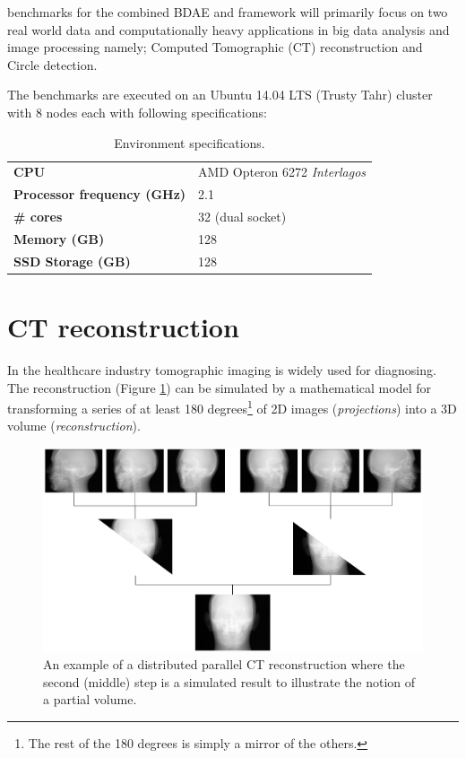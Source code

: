  benchmarks for the combined BDAE and \CodeName framework will primarily focus on two real world data and computationally heavy applications in big data analysis and image processing namely; Computed Tomographic (CT) reconstruction and Circle detection.
\newline

The benchmarks are executed on an Ubuntu 14.04 LTS (Trusty Tahr)\cite{PageUbuntu1404} cluster with 8 nodes each with following specifications:
\vspace*{5mm}
\begin{table}[h!]
	\centering
	\begin{tabular}{l l}
		\textbf{CPU} & AMD Opteron 6272 \emph{Interlagos} \\
		\textbf{Processor frequency (GHz)} & 2.1 \\
		\textbf{\# cores} & 32 (dual socket) \\
		\textbf{Memory (GB)} & 128 \\
		\textbf{SSD Storage (GB)} & 128 
	\end{tabular}
	\caption{Environment specifications.\label{tab:specifications}}
\end{table}

\section{CT reconstruction}
In the healthcare industry tomographic imaging is widely used for diagno\-sing. The reconstruction (Figure \ref{fig:ct}) can be simulated by a mathematical model for transforming a series of at least 180 degrees\footnote{The rest of the 180 degrees is simply a mirror of the others.} of 2D images (\textit{projections}) into a 3D volume (\textit{reconstruction}).
\newpage

\begin{figure}
	\vspace*{3mm}
	\centering
	\includegraphics[scale=0.25]{pdf/CT.pdf}
	\caption[]{An example of a distributed parallel CT reconstruction where the second (middle) step is a simulated result to illustrate the notion of a partial volume. \label{fig:ct}}
	\vspace*{3mm}
\end{figure}

